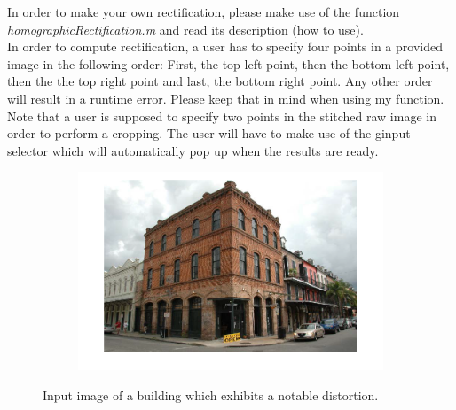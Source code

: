 \documentclass{paper}
\begin{document}
In order to make your own rectification, please make use of the function \emph{homographicRectification.m} and read its description (how to use). \\

In order to compute rectification, a user has to specify four points in a provided image in the following order: First, the top left point, then the bottom left point, then the the top right point and last, the bottom right point. Any other order will result in a runtime error. Please keep that in mind when using my function. \\

Note that a user is supposed to specify two points in the stitched raw image in order to perform a cropping. The user will have to make use of the ginput selector which will automatically pop up when the results are ready.

\begin{figure}[H]
    \centering
    \begin{subfigure}{1.0\textwidth}
        \includegraphics[width=\textwidth]{rectify/input_building}
    \end{subfigure}
    
    \caption{Input image of a building which exhibits a notable distortion.}
    \label{fig:rectify_input_building}       
\end{figure}
\end{document}
